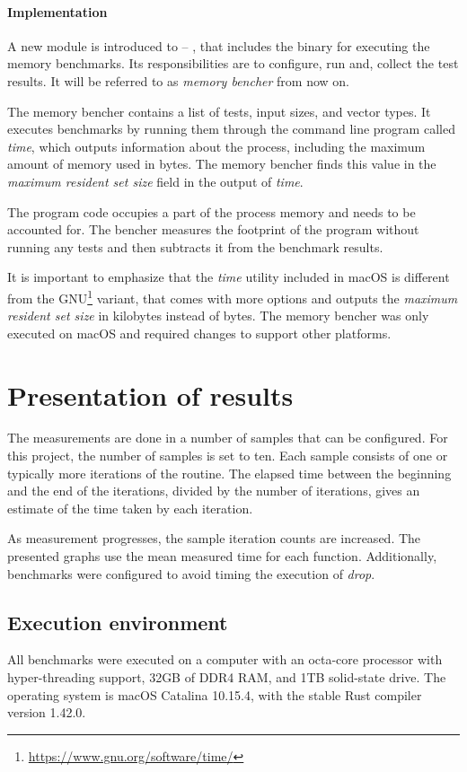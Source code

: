 \paragraph{Implementation}
A new module is introduced to \pvecrs{} -- , that includes the binary for executing the memory benchmarks. Its responsibilities are to configure, run and, collect the test results. It will be referred to as \emph{memory bencher} from now on. 

The memory bencher contains a list of tests, input sizes, and vector types. It executes benchmarks by running them through the command line program called \emph{time}, which outputs information about the process, including the maximum amount of memory used in bytes. The memory bencher finds this value in the \emph{maximum resident set size} field in the output of \emph{time}.

The program code occupies a part of the process memory and needs to be accounted for. The bencher measures the footprint of the program without running any tests and then subtracts it from the benchmark results.

It is important to emphasize that the \emph{time} utility included in macOS is different from the GNU\footnote{\url{https://www.gnu.org/software/time/}} variant, that comes with more options and outputs the \emph{maximum resident set size} in kilobytes instead of bytes. The memory bencher was only executed on macOS and required changes to support other platforms.

\section{Presentation of results}
The measurements are done in a number of samples that can be configured. For this project, the number of samples is set to ten. Each sample consists of one or typically more iterations of the routine. The elapsed time between the beginning and the end of the iterations, divided by the number of iterations, gives an estimate of the time taken by each iteration.

As measurement progresses, the sample iteration counts are increased. The presented graphs use the mean measured time for each function. Additionally, benchmarks were configured to avoid timing the execution of \emph{drop}.

\subsection{Execution environment}
All benchmarks were executed on a computer with an octa-core processor with hyper-threading support, 32GB of DDR4 RAM, and 1TB solid-state drive. The operating system is macOS Catalina 10.15.4, with the stable Rust compiler version 1.42.0.

